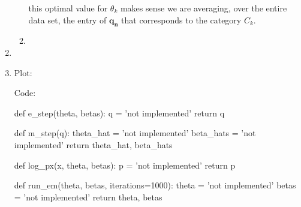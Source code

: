 \documentclass[submit]{harvardml}
\begin{document}
\begin{enumerate}
\begin{enumerate}
      this optimal value for $\theta_k$ makes sense we are averaging, over the entire data set,
      the entry of $\mathbf{q_n}$ that corresponds to the category $C_k$.
      \item
    \end{enumerate}
  \item 
  \item 
    Plot:


    Code:

    \begin{python}
def e_step(theta, betas):
    q = 'not implemented'
    return q


def m_step(q):
    theta_hat = 'not implemented'
    beta_hats = 'not implemented'
    return theta_hat, beta_hats


def log_px(x, theta, betas):
    p = 'not implemented'
    return p


def run_em(theta, betas, iterations=1000):
    theta = 'not implemented'
    betas = 'not implemented'
    return theta, betas
    \end{python}
\end{enumerate}


\newpage
\end{document}
